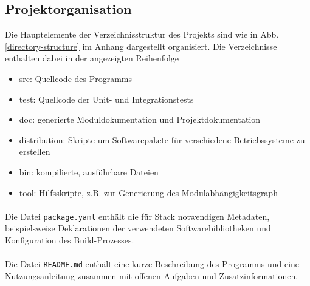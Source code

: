\subsection{Projektorganisation}
Die Hauptelemente der Verzeichnisstruktur des Projekts sind wie in Abb. \ref{directory-structure}
im Anhang dargestellt organisiert. Die Verzeichnisse enthalten dabei in der angezeigten Reihenfolge

\begin{itemize}
    \item src: Quellcode des Programms
    \item test: Quellcode der Unit- und Integrationstests
    \item doc: generierte Moduldokumentation und Projektdokumentation
    \item distribution: Skripte um Softwarepakete für verschiedene Betriebssysteme zu erstellen
    \item bin: kompilierte, ausführbare Dateien
    \item tool: Hilfsskripte, z.B. zur Generierung des Modulabhängigkeitsgraph
\end{itemize}

\paragraph{}
Die Datei \texttt{package.yaml} enthält die für Stack notwendigen Metadaten,
beispielsweise Deklarationen der verwendeten Softwarebibliotheken und Konfiguration
des Build-Prozesses.

\paragraph{}
Die Datei \texttt{README.md} enthält eine kurze Beschreibung des
Programms und eine Nutzungsanleitung zusammen mit offenen Aufgaben und
Zusatzinformationen.